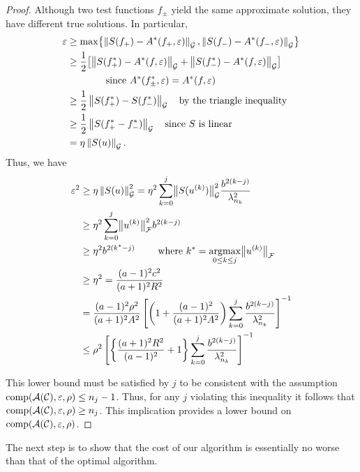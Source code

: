 \documentclass[final]{elsarticle}
\theoremstyle{definition}
\theoremstyle{remark}
\begin{document}
\begin{proof}
Although two test functions $f_\pm$ yield the same approximate solution, they have different true solutions.  In particular,
\begin{align*}
\varepsilon &\ge \max \bigl\{\norm[\cg]{S(f_+) - A^*(f_+,\varepsilon)}, \norm[\cg]{S(f_-) - A^*(f_-,\varepsilon)} \bigr\} \\
&\ge \frac 12 \bigl[\norm[\cg]{S(f^*_+) - A^*(f,\varepsilon)} + \norm[\cg]{S(f^*_-) - A^*(f,\varepsilon)}  \bigr] \\
&\qquad \qquad \text{since } A^*(f^*_\pm,\varepsilon) = A^*(f,\varepsilon) \\
&\ge \frac 12 \norm[\cg]{S(f^*_+) - S(f^*_-)} \quad \text{by the triangle inequality}\\
&\ge \frac 12 \norm[\cg]{S(f^*_+ - f^*_-)} \quad \text{since $S$ is linear}\\
&= \eta \norm[\cg]{S(u)}.
\end{align*}
Thus, we have
\begin{align*}
\varepsilon^2  & \ge \eta \norm[\cg]{S(u)}^2= 
\eta^2 \sum_{k=0}^{j} \bignorm[\cg]{S(u^{(k)})}^2  \frac{b^{2(k-j)}}{\lambda_{n_k}^2}\\
& \ge \eta^2 
\sum_{k=0}^{j} \bignorm[\cf]{u^{(k)}}^2 
b^{2(k-j)}\\
& \ge  \eta^2 b^{2(k^{*}-j)} \qquad \text{ where } k^* = \argmax_{0 \le k \le j} \bignorm[\cf]{u^{(k)}} \\
& \ge \eta^2 = \frac{(a-1)^2c^2}{(a+1)^2R^2} \\
&
=\frac{(a-1)^2 \rho^2}{(a+1)^2A^2}\left[\left(1+\frac{(a-1)^2}{(a+1)^{2} A^2 }\right)\sum_{k=0}^j \frac{b^{2(k-j)}}{\lambda_{n_{k}}^2}\right]^{-1} \\
& \le  \rho^2 \left[\left\{\frac{(a+1)^{2} R^2 }{(a-1)^2} + 1\right\}\sum_{k=0}^j \frac{b^{2(k-j)}}{\lambda_{n_{k}}^2}\right]^{-1} 
\end{align*}

This lower bound must be satisfied by $j$ to be consistent with the assumption $\comp(\ca(\cc),\varepsilon,\rho) \le n_j - 1$.  Thus, for any $j$ violating this inequality it follows that $\comp(\ca(\cc),\varepsilon,\rho) \ge n_j$.  This implication provides a lower bound on $\comp(\ca(\cc),\varepsilon,\rho)$.
\end{proof}

The next step is to show that the cost of our algorithm is essentially no worse than that of the optimal algorithm.
\end{document}

